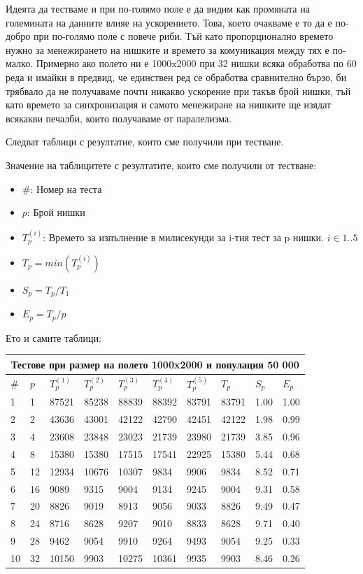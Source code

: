 \documentclass[12pt]{article}
\begin{document}
Идеята да тестваме и при по-голямо поле е да видим как промяната на големината на данните
влияе на ускорението. Това, което очакваме е то да е по-добро при по-голямо поле с повече риби.
Тъй като пропорционално времето нужно за менежирането на нишките и времето за комуникация между тях
е по-малко. Примерно ако полето ни е 1000x2000 при 32 нишки всяка обработва по 60 реда и имайки в предвид,
че единствен ред се обработва сравнително бързо, би трябвало да не получаваме почти никакво ускорение при
такъв брой нишки, тъй като времето за синхронизация и самото менежиране на нишките ще изядат всякакви
печалби, които получаваме от паралелизма.

\bigbreak

Следват таблици с резултатие, които сме получили при тестване.

\bigbreak
Значение на таблицитете с резултатите, които сме получили от тестване:
\begin{itemize}
	\item \#: Номер на теста
	\item $p$: Брой нишки
	\item $T^{(i)}_p$: Времето за изпълнение в милисекунди за i-тия тест за p нишки. $i \in 1..5$
	\item $T_p = min(T^{(i)}_p)$
	\item $S_p = T_p / T_1$
	\item $E_p = T_p / p$
\end{itemize}
\bigbreak


Ето и самите таблици:
\bigbreak

\begin{tabular}{ |p{0.6cm}||p{1cm}|p{1cm}|p{1cm}|p{1cm}|p{1cm}|p{1cm}|p{1cm}|p{0.9cm}|p{0.9cm}| }
 \hline
 \multicolumn{10}{|c|}{Тестове при размер на полето 1000x2000 и популация 50 000} \\
 \hline
 \# & $p$ & $T^{(1)}_p$ & $T^{(2)}_p$ & $T^{(3)}_p$ & $T^{(4)}_p$ & $T^{(5)}_p$ & $T_p$ & $S_p$ & $E_p$ \\
 \hline
1  & 1  & 87521 & 85238 & 88839 & 88392 & 83791 & 83791 & 1.00 & 1.00 \\
2  & 2  & 43636 &  43001 & 42122 & 42790 & 42451 & 42122 & 1.98 & 0.99 \\
3  & 4  & 23608 & 23848 & 23023 & 21739 & 23980 & 21739 & 3.85 & 0.96 \\
4  & 8  & 15380 & 15380 & 17515 & 17541 & 22925 & 15380 & 5.44 & 0.68 \\
5  & 12 & 12934 & 10676 & 10307 & 9834 & 9906 & 9834 & 8.52 & 0.71 \\
6  & 16 & 9089 & 9315 & 9004 & 9134 & 9245 & 9004 & 9.31 & 0.58 \\
7  & 20 & 8826 & 9019 & 8913 & 9056 & 9033 & 8826 & 9.49 & 0.47 \\
8  & 24 & 8716 & 8628 & 9207 & 9010 & 8833 & 8628 & 9.71 & 0.40 \\
9  & 28 & 9462 & 9054 & 9910 & 9264 & 9493 & 9054 & 9.25 & 0.33 \\
10 & 32 & 10150 & 9903 & 10275 & 10361 & 9935 & 9903 & 8.46 & 0.26 \\
 \hline
\end{tabular}
\end{document}
